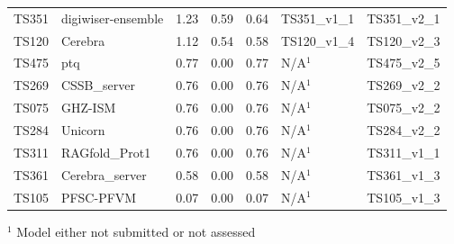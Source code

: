 \begin{table}[ht]
{\begin{tabular}{llrrrll}
TS351 & digiwiser-ensemble & 1.23 & 0.59 & 0.64 & TS351\_v1\_1 & TS351\_v2\_1 \\ 
TS120 & Cerebra & 1.12 & 0.54 & 0.58 & TS120\_v1\_4 & TS120\_v2\_3 \\ 
TS475 & ptq & 0.77 & 0.00 & 0.77 & N/A$^{1}$ & TS475\_v2\_5 \\ 
TS269 & CSSB\_server & 0.76 & 0.00 & 0.76 & N/A$^{1}$ & TS269\_v2\_2 \\ 
TS075 & GHZ-ISM & 0.76 & 0.00 & 0.76 & N/A$^{1}$ & TS075\_v2\_2 \\ 
TS284 & Unicorn & 0.76 & 0.00 & 0.76 & N/A$^{1}$ & TS284\_v2\_2 \\ 
TS311 & RAGfold\_Prot1 & 0.76 & 0.00 & 0.76 & N/A$^{1}$ & TS311\_v1\_1 \\ 
TS361 & Cerebra\_server & 0.58 & 0.00 & 0.58 & N/A$^{1}$ & TS361\_v1\_3 \\ 
TS105 & PFSC-PFVM & 0.07 & 0.00 & 0.07 & N/A$^{1}$ & TS105\_v1\_3 \\ 
\bottomrule
\end{tabular}%
}
\begin{flushleft}\footnotesize $^{1}$ Model either not submitted or not assessed\end{flushleft}
\end{table}
